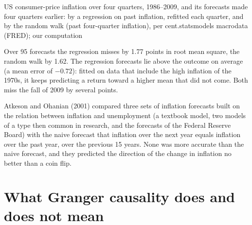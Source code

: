 \begin{omchart}{US consumer-price inflation over four quarters, 1986--2009, and its forecasts made four quarters earlier:
  by a regression on past inflation, refitted each quarter, and by the random walk (past four-quarter inflation), per
  cent.}{statsmodels macrodata (FRED); our computation}
\end{omchart}

Over 95 forecasts the regression misses by 1.77 points in root mean square, the random walk by 1.62. The regression
forecasts lie above the outcome on average (a mean error of $-0.72$): fitted on data that include the high inflation of the
1970s, it keeps predicting a return toward a higher mean that did not come. Both miss the fall of 2009 by several points.

\begin{record}
Atkeson and Ohanian (2001) compared three sets of inflation forecasts built on the relation between inflation and
unemployment (a textbook model, two models of a type then common in research, and the forecasts of the Federal Reserve
Board) with the naive forecast that inflation over the next year equals inflation over the past year, over the previous 15
years. None was more accurate than the naive forecast, and they predicted the direction of the change in inflation no
better than a coin flip.
\end{record}

\section{What Granger causality does and does not mean}\label{sec:b2:time-series:granger}

